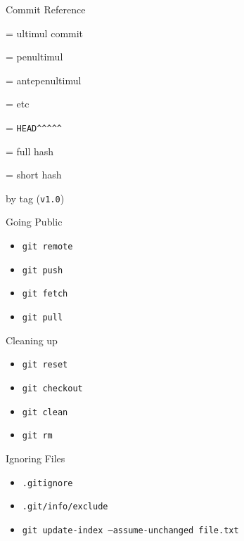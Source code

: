 \documentclass{beamer}
\begin{document}
\begin{frame}{Commit Reference}
  \begin{description}
    \item[\texttt{HEAD}] = ultimul commit
    \item[\texttt{HEAD\textasciicircum}] = penultimul
    \item[\texttt{HEAD\textasciicircum\textasciicircum}] = antepenultimul
    \item[...] = etc
    \pause
    \item[\texttt{HEAD\textasciitilde5}] = \texttt{HEAD\textasciicircum\textasciicircum\textasciicircum\textasciicircum\textasciicircum}
    \pause
    \item[a946e644d5b4c26aaa4e73338805e207bbfd78b0] = full hash
    \item[a946e6] = short hash
    \pause
    \item by tag (\texttt{v1.0})
  \end{description}
\end{frame}

\begin{frame}{Going Public}
  \begin{itemize}
    \item \texttt{git remote}
    \item \texttt{git push}
    \item \texttt{git fetch}
    \item \texttt{git pull}
  \end{itemize}
\end{frame}

\begin{frame}{Cleaning up}
  \begin{itemize}
    \item \texttt{git reset}
    \item \texttt{git checkout}
    \item \texttt{git clean}
    \item \texttt{git rm}
  \end{itemize}
\end{frame}

\begin{frame}{Ignoring Files}
  \begin{itemize}
    \item \texttt{.gitignore}
    \item \texttt{.git/info/exclude}
    \item \texttt{git update-index --assume-unchanged file.txt}
  \end{itemize}
\end{frame}
\end{document}
